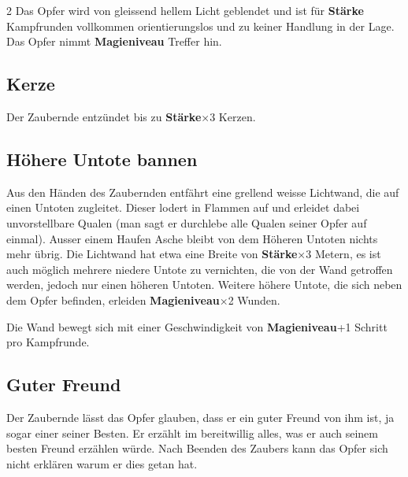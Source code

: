 \begin{multicols*}{2}
Das Opfer wird von gleissend hellem Licht geblendet und ist für \textbf{Stärke} Kampfrunden vollkommen orientierungslos und zu keiner Handlung in der Lage. Das Opfer nimmt \textbf{Magieniveau} Treffer hin.



\subsection{Kerze}

Der Zaubernde entzündet bis zu \textbf{Stärke}×3 Kerzen.



\subsection{Höhere Untote bannen}

Aus den Händen des Zaubernden entfährt eine grellend weisse Lichtwand, die auf einen Untoten zugleitet. Dieser lodert in Flammen auf und erleidet dabei unvorstellbare Qualen (man sagt er durchlebe alle Qualen seiner Opfer auf einmal). Ausser einem Haufen Asche bleibt von dem Höheren Untoten nichts mehr übrig. Die Lichtwand hat etwa eine Breite von \textbf{Stärke}×3 Metern, es ist auch möglich mehrere niedere Untote zu vernichten, die von der Wand getroffen werden, jedoch nur einen höheren Untoten. Weitere höhere Untote, die sich neben dem Opfer befinden, erleiden \textbf{Magieniveau}×2 Wunden.

Die Wand bewegt sich mit einer Geschwindigkeit von \textbf{Magieniveau}+1 Schritt pro Kampfrunde.



\subsection{Guter Freund}

Der Zaubernde lässt das Opfer glauben, dass er ein guter Freund von ihm ist, ja sogar einer seiner Besten. Er erzählt im bereitwillig alles, was er auch seinem besten Freund erzählen würde. Nach Beenden des Zaubers kann das Opfer sich nicht erklären warum er dies getan hat.


\end{multicols*}
